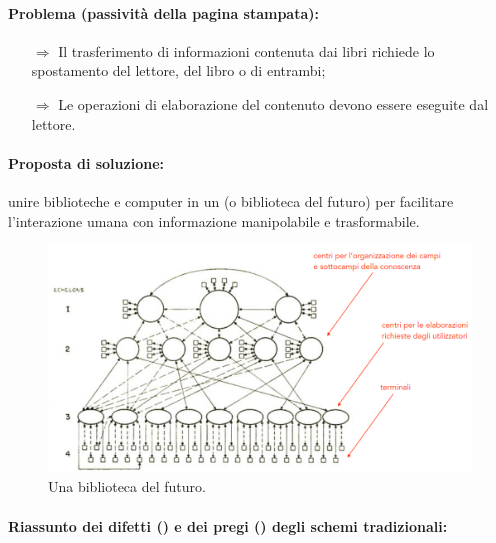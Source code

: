 \paragraph{Problema (passività della pagina stampata):}
\begin{itemize}
    \item [$\Rightarrow$] Il trasferimento di informazioni contenuta dai libri richiede lo spostamento del lettore, del libro o di entrambi;
    \item [$\Rightarrow$] Le operazioni di elaborazione del contenuto devono essere eseguite dal lettore.
    
\end{itemize}

\paragraph{Proposta di soluzione:} unire biblioteche e computer in un  (o biblioteca del futuro) per facilitare
l'interazione umana con informazione manipolabile e trasformabile.

\begin{figure}[h]
    \centering
    \includegraphics[scale=0.3]{images/SistemiP.png}
    \caption{Una biblioteca del futuro.}
\end{figure}

\paragraph{Riassunto dei difetti (\textcolor{red}{\XSolidBrush}) e dei pregi (\textcolor{green}{\Checkmark}) degli schemi tradizionali:}

